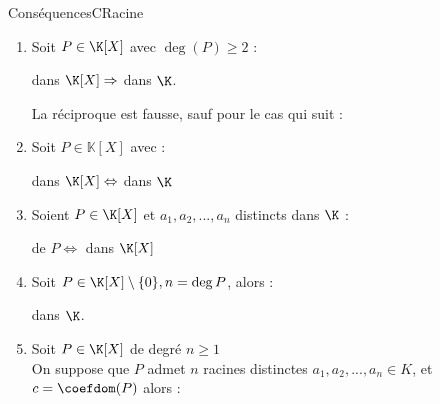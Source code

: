 \documentclass[12pt,a4paper]{report}
\begin{document}
        \begin{propositions}{Conséquences}{CRacine}
        \begin{enumerate}
            \item Soit $P \in \K[X]$ avec $\deg(P) \geqslant2 $ : 
            \begin{center}
             dans $\K[X] \Rightarrow$  dans $\K$.
            \end{center}
            \begin{remarque}
            La réciproque est fausse, sauf pour le cas qui suit : \\
            \end{remarque}
            \item Soit $P \in \mathbb{K}[X]$ avec  :
            \begin{center}
             dans $\K[X] \Leftrightarrow$  dans $\K$
            \end{center}
            \item Soient $P \in \K[X]$ et $a_1, a_2, ..., a_n$ distincts dans $\K$ :
            \begin{center}
             de $P \Leftrightarrow$  dans $\K[X]$
            \end{center}
            \item Soit $P \in \K[X]\setminus \lbrace0\rbrace, n=\deg P$, alors : 
            \begin{center}
                 dans $\K$.
            \end{center}
            \item Soit $P \in \K[X]$ de degré $n \geq 1$\\
            On suppose que $P$ admet $n$ racines distinctes $a_{1},a_{2},...,a_{n}\in K$, et $c=\coefdom(P)$ alors : 
            \begin{center}
            \end{center}
        \end{enumerate}
        \end{propositions}
        
\end{document}
